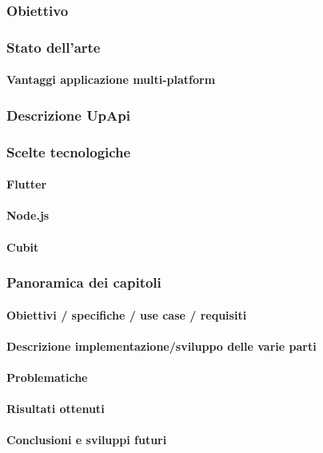 \documentclass[12pt]{article}
\begin{document}
\subsubsection{Obiettivo}
\subsubsection{Stato dell’arte}
\paragraph{Vantaggi applicazione multi-platform}

\subsubsection{Descrizione UpApi}
\subsubsection{Scelte tecnologiche}
\paragraph{Flutter}
\paragraph{Node.js}
\paragraph{Cubit}

\subsubsection{Panoramica dei capitoli}
\paragraph{Obiettivi / specifiche / use case / requisiti}
\paragraph{Descrizione implementazione/sviluppo delle varie parti}
\paragraph{Problematiche}
\paragraph{Risultati ottenuti}
\paragraph{Conclusioni e sviluppi futuri}
\end{document}

